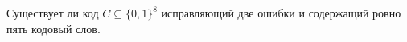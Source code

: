 Существует ли код $C \subseteq \{0, 1\}^8$ исправляющий две ошибки и содержащий ровно пять кодовый слов.